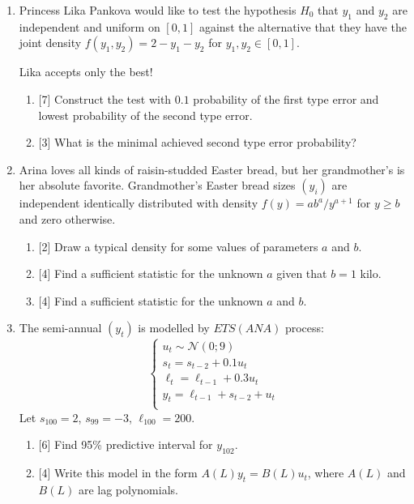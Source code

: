 \documentclass[12pt]{article}
\newcommand{\cN}{\mathcal{N}}
\begin{document}
\begin{enumerate}
    \newpage 

    \item Princess Lika Pankova would like to test the hypothesis $H_0$ that $y_1$ and $y_2$ are independent and uniform on $[0, 1]$ 
    against the alternative that they have the joint density $f(y_1, y_2) = 2 - y_1 - y_2$ for $y_1, y_2 \in [0, 1]$.
    
    Lika accepts only the best! 
    \begin{enumerate}
        \item {[7]} Construct the test with $0.1$ probability of the first type error and lowest probability of the second type error.
        \item {[3]} What is the minimal achieved second type error probability?
    \end{enumerate}
    
    \item Arina loves all kinds of raisin-studded Easter bread, but her grandmother's is her absolute favorite.
    Grandmother's Easter bread sizes $(y_i)$ are independent identically distributed with density 
    $f(y) = ab^a/y^{a+1}$ for $y \geq b$ and zero otherwise. 

    \begin{enumerate}
        \item {[2]} Draw a typical density for some values of parameters $a$ and $b$. 
        \item {[4]} Find a sufficient statistic for the unknown $a$ given that $b = 1$ kilo. 
        \item {[4]} Find a sufficient statistic for the unknown $a$ and $b$. 
    \end{enumerate}
    
    \item   The semi-annual $(y_t)$ is modelled by $ETS(ANA)$ process:
    \[
    \begin{cases}
        u_t \sim \cN(0; 9) \\
        s_t = s_{t-2} + 0.1 u_t \\
        \ell_t = \ell_{t-1} + 0.3 u_t \\
        y_t = \ell_{t-1} + s_{t-2} + u_t \\
    \end{cases}    
    \]
    Let $s_{100} = 2$, $s_{99} = -3$, $\ell_{100} = 200$.
    \begin{enumerate}
      \item {[6]} Find 95\% predictive interval for $y_{102}$.
      \item {[4]} Write this model in the form $A(L) y_t = B(L) u_t$, where $A(L)$ and $B(L)$ are lag polynomials.
    \end{enumerate}
  
\end{enumerate}
\end{document}
